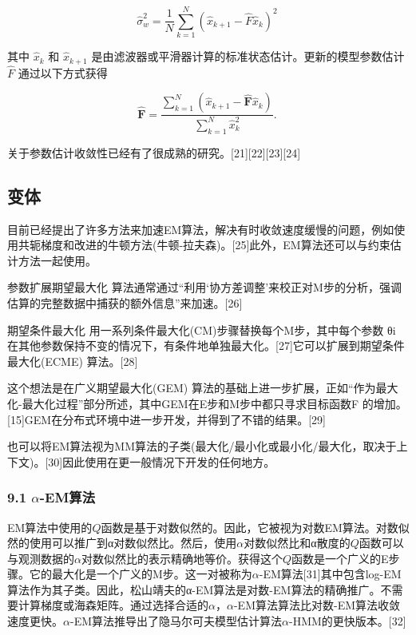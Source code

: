 \begin{equation}
\hat\sigma_w^2 = \frac{1}{N} \sum_{k=1}^{N} \left( \hat{x}_{k+1} - \hat{F} \hat{x}_k \right)^2~
\end{equation}

其中 $\hat{x}_k$ 和 $\hat{x}_{k+1}$ 是由滤波器或平滑器计算的标准状态估计。更新的模型参数估计 $\hat{F}$ 通过以下方式获得

\begin{equation}
\hat{\mathbf{F}} = \frac{\sum_{k=1}^{N} (\hat{x}_{k+1} - \hat{\mathbf{F}} \hat{x}_{k})}{\sum_{k=1}^{N} \hat{x}_{k}^{2}}.~
\end{equation}

关于参数估计收敛性已经有了很成熟的研究。[21][22][23][24]

\subsection{变体}

目前已经提出了许多方法来加速EM算法，解决有时收敛速度缓慢的问题，例如使用共轭梯度和改进的牛顿方法(牛顿-拉夫森)。[25]此外，EM算法还可以与约束估计方法一起使用。

参数扩展期望最大化 算法通常通过“利用‘协方差调整’来校正对M步的分析，强调估算的完整数据中捕获的额外信息”来加速。[26]

期望条件最大化 用一系列条件最大化(CM)步骤替换每个M步，其中每个参数 θi 在其他参数保持不变的情况下，有条件地单独最大化。[27]它可以扩展到期望条件最大化(ECME) 算法。[28]

这个想法是在广义期望最大化(GEM) 算法的基础上进一步扩展，正如“作为最大化-最大化过程”部分所述，其中GEM在E步和M步中都只寻求目标函数F 的增加。[15]GEM在分布式环境中进一步开发，并得到了不错的结果。[29]

也可以将EM算法视为MM算法的子类(最大化/最小化或最小化/最大化，取决于上下文)。[30]因此使用在更一般情况下开发的任何地方。

\subsubsection{9.1 $\alpha$-EM算法}

EM算法中使用的$Q$函数是基于对数似然的。因此，它被视为对数EM算法。对数似然的使用可以推广到α对数似然比。然后，使用$\alpha$对数似然比和α散度的$Q$函数可以与观测数据的$\alpha$对数似然比的表示精确地等价。获得这个$Q$函数是一个广义的E步骤。它的最大化是一个广义的M步。这一对被称为$\alpha$-EM算法[31]其中包含log-EM算法作为其子类。因此，松山靖夫的α-EM算法是对数-EM算法的精确推广。不需要计算梯度或海森矩阵。通过选择合适的$\alpha$，$\alpha$-EM算法算法比对数-EM算法收敛速度更快。$\alpha$-EM算法推导出了隐马尔可夫模型估计算法$\alpha$-HMM的更快版本。[32]

